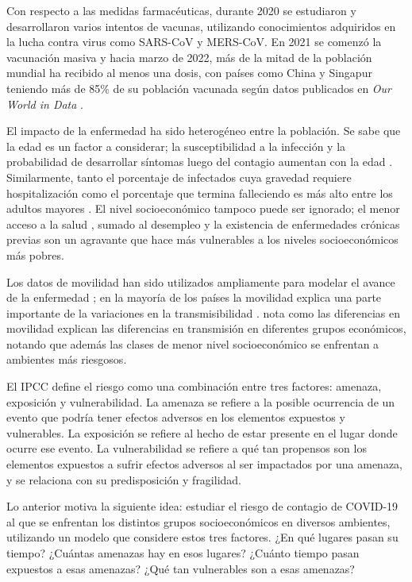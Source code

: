 \begin{intro}
Con respecto a las medidas farmacéuticas, durante 2020 se estudiaron y desarrollaron varios intentos de vacunas, utilizando conocimientos adquiridos en la lucha contra virus como SARS-CoV y MERS-CoV. En 2021 se comenzó la vacunación masiva y hacia marzo de 2022, más de la mitad de la población mundial ha recibido al menos una dosis, con países como China y Singapur teniendo más de 85\% de su población vacunada según datos publicados en \textit{Our World in Data} \cite{Mathieu2021}.

El impacto de la enfermedad ha sido heterogéneo entre la población. Se sabe que la edad es un factor a considerar; la susceptibilidad a la infección y la probabilidad de desarrollar síntomas luego del contagio aumentan con la edad \cite{Davies2020}. Similarmente, tanto el porcentaje de infectados cuya gravedad requiere hospitalización como el porcentaje que termina falleciendo es más alto entre los adultos mayores \cite{Verity2020}. El nivel socioeconómico tampoco puede ser ignorado; el menor acceso a la salud \cite{Wang2020}, sumado al desempleo y la existencia de enfermedades crónicas previas \cite{Ahmed2020} son un agravante que hace más vulnerables a los niveles socioeconómicos más pobres.

Los datos de movilidad han sido utilizados ampliamente para modelar el avance de la enfermedad \cite{Lai2020}\cite{Kraemer2020}\cite{Chinazzi2020}; en la mayoría de los países la movilidad explica una parte importante de la variaciones en la transmisibilidad \cite{Nouvellet2021}. \cite{Chang2021} nota como las diferencias en movilidad explican las diferencias en transmisión en diferentes grupos económicos, notando que además las clases de menor nivel socioeconómico se enfrentan a ambientes más riesgosos.


El IPCC define \cite{Field2012} el riesgo como una combinación entre tres factores: amenaza, exposición y vulnerabilidad. La amenaza se refiere a la posible ocurrencia de un evento que podría tener efectos adversos en los elementos expuestos y vulnerables. La exposición se refiere al hecho de estar presente en el lugar donde ocurre ese evento. La vulnerabilidad se refiere a qué tan propensos son los elementos expuestos a sufrir efectos adversos al ser impactados por una amenaza, y se relaciona con su predisposición y fragilidad.

Lo anterior motiva la siguiente idea: estudiar el riesgo de contagio de COVID-19 al que se enfrentan los distintos grupos socioeconómicos en diversos ambientes, utilizando un modelo que considere estos tres factores. ¿En qué lugares pasan su tiempo? ¿Cuántas amenazas hay en esos lugares? ¿Cuánto tiempo pasan expuestos a esas amenazas? ¿Qué tan vulnerables son a esas amenazas? 


\end{intro}
